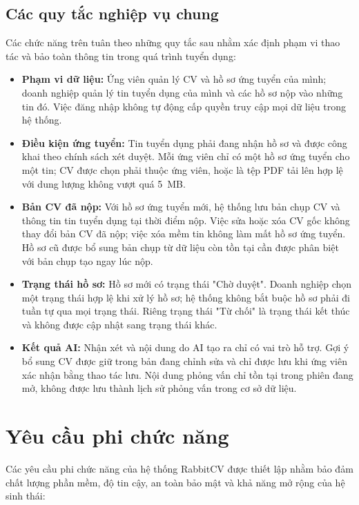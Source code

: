 \subsection{Các quy tắc nghiệp vụ chung}

Các chức năng trên tuân theo những quy tắc sau nhằm xác định phạm vi thao tác và bảo toàn thông tin trong quá trình tuyển dụng:
\begin{itemize}
    \item \textbf{Phạm vi dữ liệu:} Ứng viên quản lý CV và hồ sơ ứng tuyển của mình; doanh nghiệp quản lý tin tuyển dụng của mình và các hồ sơ nộp vào những tin đó. Việc đăng nhập không tự động cấp quyền truy cập mọi dữ liệu trong hệ thống.
    \item \textbf{Điều kiện ứng tuyển:} Tin tuyển dụng phải đang nhận hồ sơ và được công khai theo chính sách xét duyệt. Mỗi ứng viên chỉ có một hồ sơ ứng tuyển cho một tin; CV được chọn phải thuộc ứng viên, hoặc là tệp PDF tải lên hợp lệ với dung lượng không vượt quá 5~MB.
    \item \textbf{Bản CV đã nộp:} Với hồ sơ ứng tuyển mới, hệ thống lưu bản chụp CV và thông tin tin tuyển dụng tại thời điểm nộp. Việc sửa hoặc xóa CV gốc không thay đổi bản CV đã nộp; việc xóa mềm tin không làm mất hồ sơ ứng tuyển. Hồ sơ cũ được bổ sung bản chụp từ dữ liệu còn tồn tại cần được phân biệt với bản chụp tạo ngay lúc nộp.
    \item \textbf{Trạng thái hồ sơ:} Hồ sơ mới có trạng thái "Chờ duyệt". Doanh nghiệp chọn một trạng thái hợp lệ khi xử lý hồ sơ; hệ thống không bắt buộc hồ sơ phải đi tuần tự qua mọi trạng thái. Riêng trạng thái "Từ chối" là trạng thái kết thúc và không được cập nhật sang trạng thái khác.
    \item \textbf{Kết quả AI:} Nhận xét và nội dung do AI tạo ra chỉ có vai trò hỗ trợ. Gợi ý bổ sung CV được giữ trong bản đang chỉnh sửa và chỉ được lưu khi ứng viên xác nhận bằng thao tác lưu. Nội dung phỏng vấn chỉ tồn tại trong phiên đang mở, không được lưu thành lịch sử phỏng vấn trong cơ sở dữ liệu.
\end{itemize}

\section{Yêu cầu phi chức năng}

Các yêu cầu phi chức năng của hệ thống RabbitCV được thiết lập nhằm bảo đảm chất lượng phần mềm, độ tin cậy, an toàn bảo mật và khả năng mở rộng của hệ sinh thái:

